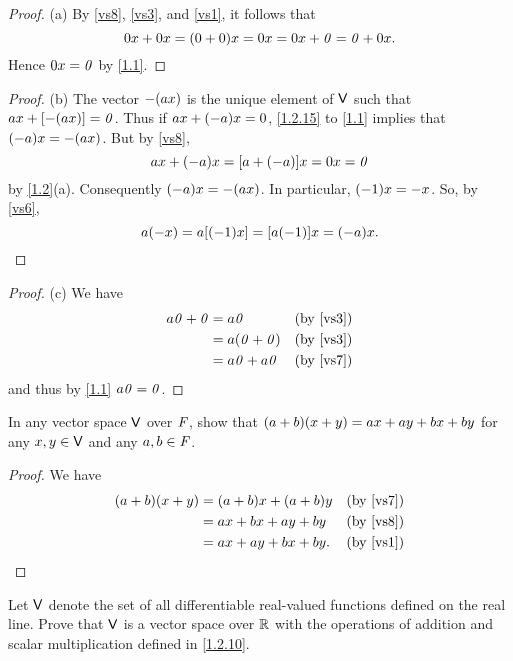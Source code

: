 \begin{proof}{(a)}
	By \ref{vs8}, \ref{vs3}, and \ref{vs1}, it follows that
	\[
		0x + 0x = \p{0 + 0} x = 0x = 0x + \zv = \zv + 0x.
	\]
	Hence \(0x = \mathit{0}\) by \cref{1.1}.
\end{proof}

\begin{proof}{(b)}
	The vector \(-\p{ax}\) is the unique element of \(\mathsf{V}\) such that \(ax + \bk{-\p{ax}} = \zv\).
	Thus if \(ax + \p{-a}x = 0\), \cref{1.2.15} to \cref{1.1} implies that \(\p{-a}x = -\p{ax}\).
	But by \ref{vs8},
	\[
		ax + \p{-a}x = \bk{a + \p{-a}}x = 0x = \zv
	\]
	by \cref{1.2}(a).
	Consequently \(\p{-a}x = -\p{ax}\).
	In particular, \(\p{-1}x = -x\).
	So, by \ref{vs6},
	\[
		a\p{-x} = a\bk{\p{-1}x} = \bk{a\p{-1}}x = \p{-a}x.
	\]
\end{proof}

\begin{proof}{(c)}
	We have
	\begin{align*}
		a\zv + \zv & = a\zv           &  & \text{(by \ref{vs3})} \\
		           & = a\p{\zv + \zv} &  & \text{(by \ref{vs3})} \\
		           & = a\zv + a\zv    &  & \text{(by \ref{vs7})}
	\end{align*}
	and thus by \cref{1.1} \(a\mathit{0} = \mathit{0}\).
\end{proof}

\exercisesection

\setcounter{ex}{7}
\begin{ex}\label{ex:1.2.8}
	In any vector space \(\mathsf{V}\) over \(\mathit{F}\), show that \(\p{a + b}\p{x + y} = ax + ay + bx + by\) for any \(x, y \in \mathsf{V}\) and any \(a, b \in \mathit{F}\).
\end{ex}

\begin{proof}
	We have
	\begin{align*}
		\p{a + b}\p{x + y} & = \p{a + b} x + \p{a + b} y &  & \text{(by \ref{vs7})} \\
		                   & = ax + bx + ay + by         &  & \text{(by \ref{vs8})} \\
		                   & = ax + ay + bx + by.        &  & \text{(by \ref{vs1})}
	\end{align*}
\end{proof}

\setcounter{ex}{9}
\begin{ex}\label{ex:1.2.10}
	Let \(\mathsf{V}\) denote the set of all differentiable real-valued functions defined on the real line.
	Prove that \(\mathsf{V}\) is a vector space over \(\mathbb{R}\) with the operations of addition and scalar multiplication defined in \cref{1.2.10}.
\end{ex}

